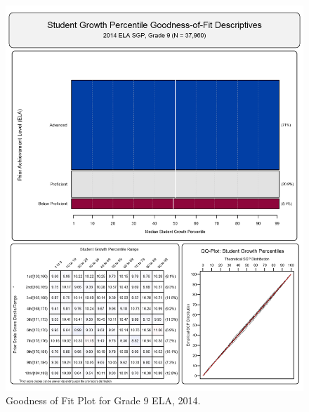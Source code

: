 \documentclass[12pt]{article}
\begin{document}
\begin{figure}[htbp]
\centering
\includegraphics{../img/Goodness_of_Fit/ELA.2014/2014_ELA_9;2013_ELA_8;2012_ELA_7;2011_ELA_6;2010_ELA_5;2009_ELA_4;2008_ELA_3.png}
\caption{Goodness of Fit Plot for Grade 9 ELA, 2014.}
\end{figure}
\end{document}
